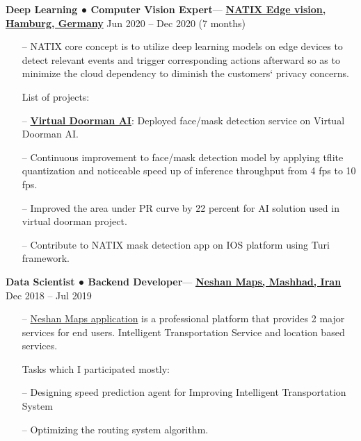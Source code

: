 \documentclass[10pt]{article}
\newenvironment{loneinnerlist}[1][\enskip\textbullet]%
        {\vspace{-\baselineskip}\begin{compactitem}[#1]}
        {\end{compactitem}\vspace{-.6\baselineskip}}
\newcommand{\halfblankline}{\quad\vspace{-0.5\baselineskip}\pagebreak[3]}
\begin{document}
\begin{loneinnerlist}
\begin{itemize}
\end{itemize}

\item \textbf{Deep Learning ● Computer Vision Expert}— \href{https://www.natix.io}{\textbf{NATIX Edge vision, Hamburg, Germany}} Jun 2020 -- Dec 2020 (7 months)

\begin{itemize}
    \item[--] NATIX core concept is to utilize deep learning models on edge devices to detect relevant events and trigger corresponding actions afterward  so as to minimize the cloud dependency to diminish the customers` privacy concerns.

    List of projects:
    \item[--] \href{https://www.natix.io/products/virtual-doorman}{\textbf{Virtual Doorman AI}}: Deployed face/mask detection service on Virtual Doorman AI.
    \item[--] Continuous improvement to face/mask detection model by applying tflite quantization and noticeable speed up of inference throughput from 4 fps to 10 fps.
    \item[--] Improved the area under PR curve by 22 percent for AI solution used in virtual doorman project.
    \item[--] Contribute to NATIX mask detection app on IOS platform using Turi framework.

\end{itemize}


\item \textbf{Data Scientist ● Backend Developer}— \href{https://neshan.org/}{\textbf{Neshan Maps, Mashhad, Iran}} Dec 2018 -- Jul 2019

\begin{itemize}
    \item[--] \href{https://play.google.com/store/apps/details?id=org.rajman.neshan.traffic.tehran.navigator&hl=en_US}{Neshan Maps application} is a professional platform that provides 2 major services for end users. Intelligent Transportation Service and location based services.

    Tasks which I participated mostly:
    \item[--] Designing speed prediction agent for Improving Intelligent Transportation System
    \item[--] Optimizing the routing system algorithm.


\end{itemize}

\halfblankline

\end{loneinnerlist}
\end{document}
